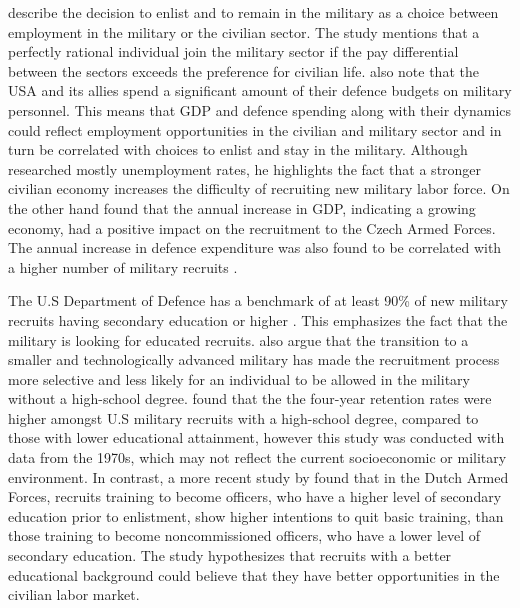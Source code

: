 \textcite{warner_chapter_1995} describe the decision to enlist and to remain in the military
as a choice between employment in the military or the civilian sector. The study 
mentions that a perfectly rational individual join the military sector if the pay
differential between the sectors exceeds the preference for civilian life. \textcite{warner_chapter_1995} 
also note that the USA and its allies spend a significant amount of 
their defence budgets on military personnel. This means that GDP and defence spending 
along with their dynamics could reflect employment opportunities in the civilian and 
military sector and in turn be correlated with choices to enlist and stay in the military.
Although \textcite{backstrom_are_2019} researched mostly unemployment rates, he highlights 
the fact that a stronger civilian economy increases the difficulty of recruiting new military 
labor force. On the other hand \textcite{holcner_military_2021} found that the annual 
increase in GDP, indicating a growing economy, had a positive impact on the recruitment to the 
Czech Armed Forces. The annual increase in defence expenditure was also found to be 
correlated with a higher number of military recruits \parencite{holcner_military_2021}.

The U.S Department of Defence has a benchmark of at least 90\% of new military recruits 
having secondary education or higher \parencite{cnas_resources_and_force_readiness_division_fiscal_nodate}.
This emphasizes the fact that the military is looking for educated recruits. \textcite{asoni_rich_2013} 
also argue that the transition to a smaller and technologically advanced military has 
made the recruitment process more selective and less likely for an individual to 
be allowed in the military without a high-school degree. \textcite{elster_study_1982} 
found that the the four-year retention rates were higher amongst U.S military recruits 
with a high-school degree, compared to those with lower educational attainment, however 
this study was conducted with data from the 1970s, which may not reflect the current 
socioeconomic or military environment. 
In contrast, a more recent study by \textcite{hof_quality_2023} found that in the 
Dutch Armed Forces, recruits training to become officers, who have a higher level of 
secondary education prior to enlistment, show higher intentions to quit basic training, 
than those training to become noncommissioned officers, who have a lower level of 
secondary education. The study hypothesizes that recruits with a better educational 
background could believe that they have better opportunities in the civilian labor market.

